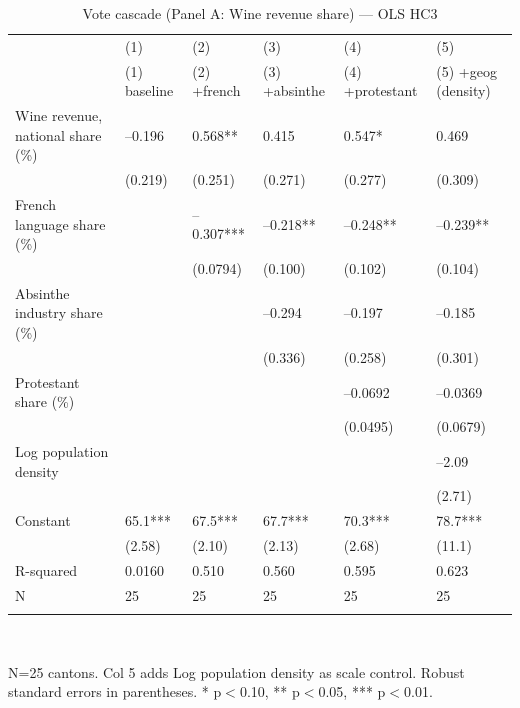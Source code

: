 \begin{table}[tbp] \centering
{}

\caption{Vote cascade (Panel A: Wine revenue share) --- OLS HC3}
\label{tab:T2_X3_OLS}
\begin{tabularx}{\linewidth}{@{}lCCCCC@{}}

\toprule
&{(1)}&{(2)}&{(3)}&{(4)}&{(5)} \tabularnewline
 & (1) baseline & (2) +french & (3) +absinthe & (4) +protestant & (5) +geog (density) \tabularnewline 
\midrule \addlinespace[\belowrulesep]
Wine revenue, national share (\%)&--0.196&0.568**&0.415&0.547*&0.469 \tabularnewline
&(0.219)&(0.251)&(0.271)&(0.277)&(0.309) \tabularnewline
French language share (\%)&&--0.307***&--0.218**&--0.248**&--0.239** \tabularnewline
&&(0.0794)&(0.100)&(0.102)&(0.104) \tabularnewline
Absinthe industry share (\%)&&&--0.294&--0.197&--0.185 \tabularnewline
&&&(0.336)&(0.258)&(0.301) \tabularnewline
Protestant share (\%)&&&&--0.0692&--0.0369 \tabularnewline
&&&&(0.0495)&(0.0679) \tabularnewline
Log population density&&&&&--2.09 \tabularnewline
&&&&&(2.71) \tabularnewline
Constant&65.1***&67.5***&67.7***&70.3***&78.7*** \tabularnewline
&(2.58)&(2.10)&(2.13)&(2.68)&(11.1) \tabularnewline
\midrule R-squared&0.0160&0.510&0.560&0.595&0.623 \tabularnewline
N&25&25&25&25&25 \tabularnewline
\bottomrule \addlinespace[\belowrulesep]

\end{tabularx}
\\ \parbox{\linewidth}{\footnotesize N=25 cantons. Col 5 adds Log population density as scale control. Robust standard errors in parentheses. * p\(<\)0.10, ** p\(<\)0.05, *** p\(<\)0.01.}
\end{table}
